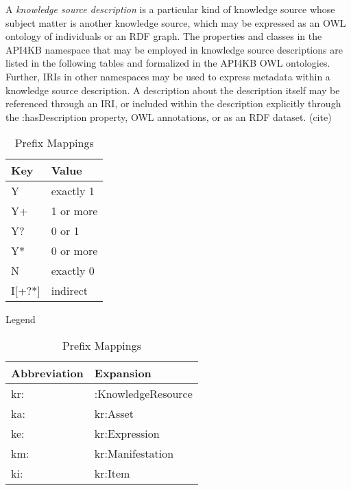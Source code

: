 \documentclass[runningheads]{llncs}
\begin{document}
A \emph{knowledge source description} is a particular kind of knowledge source whose subject matter is another knowledge source, which may be expressed as an OWL ontology of individuals or an RDF graph. The properties and classes in the API4KB namespace that may be employed in knowledge source descriptions are listed in the following tables and formalized in the API4KB OWL ontologies. Further, IRIs in other namespaces may be used to express metadata within a knowledge source description. A description about the description itself may be referenced through an IRI, or included within the description explicitly through the :hasDescription property,  OWL annotations, or as an RDF dataset. (cite)

\begin{table}[h]
\begin{minipage}[b]{0.45\linewidth}
\centering
\begin{tabular}{|l|l|}
\hline
\textbf{Key} & \textbf{Value} \\ \hline
Y            & exactly 1      \\ \hline
Y+           & 1 or more      \\ \hline
Y?           & 0 or 1         \\ \hline
Y*           & 0 or more      \\ \hline
N            & exactly 0      \\ \hline
I[+?*]       & indirect      \\ \hline
\end{tabular}
\caption{Legend}
\label{legend}
\end{minipage}
\hspace{0.5cm}
\begin{minipage}[b]{0.45\linewidth}
\centering
\begin{tabular}{|l|l|}
\hline
\textbf{Abbreviation} & \textbf{Expansion} \\ \hline
kr:            & :KnowledgeResource      \\ \hline
ka:            & kr:Asset      \\ \hline
ke:            & kr:Expression      \\ \hline
km:            & kr:Manifestation      \\ \hline
ki:            & kr:Item      \\ \hline
\end{tabular}
\caption{Prefix Mappings}
\label{abbreviations}
\end{minipage}
\end{table}
\end{document}
